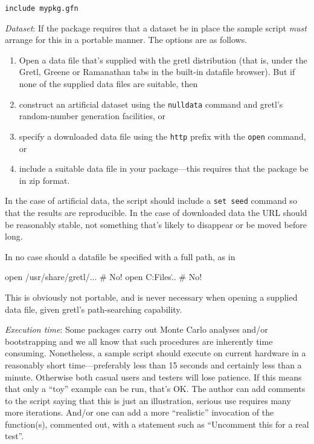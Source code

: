 \documentclass[oneside]{book}
\begin{document}
  \texttt{include mypkg.gfn}

\vspace{1ex}
\textit{Dataset}: If the package requires that a dataset be in
  place the sample script \textit{must} arrange for this in a portable
  manner. The options are as follows.
 \begin{enumerate}
 \item Open a data file that's supplied with the gretl distribution
   (that is, under the \textsf{Gretl}, \textsf{Greene} or
   \textsf{Ramanathan} tabs in the built-in datafile browser).
   But if none of the supplied data files are suitable, then
 \item construct an artificial dataset using the \texttt{nulldata}
   command and gretl's random-number generation facilities, or
 \item specify a downloaded data file using the \texttt{http} prefix
   with the \texttt{open} command, or
 \item include a suitable data file in your package---this requires
   that the package be in zip format.
 \end{enumerate}
 In the case of artificial data, the script should include a
 \texttt{set seed} command so that the results are reproducible. In
 the case of downloaded data the URL should be reasonably stable, not
 something that's likely to disappear or be moved before long.

 In no case should a datafile be specified with a full path, as in
 \begin{code}
 open /usr/share/gretl/...       # No!
 open C:\Program Files\gretl\... # No!
 \end{code}
  This is obviously not portable, and is never necessary when opening
  a supplied data file, given gretl's path-searching capability.

\vspace{1ex}
\textit{Execution time}: Some packages carry out Monte Carlo
  analyses and/or bootstrapping and we all know that such procedures
  are inherently time consuming. Nonetheless, a sample script should
  execute on current hardware in a reasonably short time---preferably
  less than 15 seconds and certainly less than a minute. Otherwise
  both casual users and testers will lose patience. If this means that
  only a ``toy'' example can be run, that's OK. The author can add
  comments to the script saying that this is just an illustration,
  serious use requires many more iterations. And/or one can add a more
  ``realistic'' invocation of the function(s), commented out, with a
  statement such as ``Uncomment this for a real test''.
\end{document}
